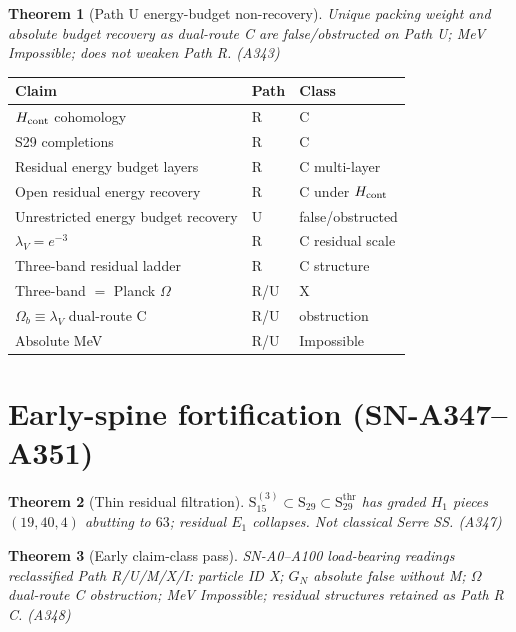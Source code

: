 \documentclass[11pt,a4paper]{article}
\newtheorem{theorem}{Theorem}
\theoremstyle{remark}
\begin{document}
\begin{theorem}[Path U energy-budget non-recovery]
Unique packing weight and absolute budget recovery as dual-route C are false/obstructed on Path U; MeV Impossible; does not weaken Path R. (A343)
\end{theorem}

\begin{center}
\begin{tabular}{@{}p{4.2cm}p{2cm}p{5.5cm}@{}}
\toprule
Claim & Path & Class \\
\midrule
$H_{\rm cont}$ cohomology & R & C \\
S29 completions & R & C \\
Residual energy budget layers & R & C multi-layer \\
Open residual energy recovery & R & C under $H_{\rm cont}$ \\
Unrestricted energy budget recovery & U & false/obstructed \\
$\lambda_V=e^{-3}$ & R & C residual scale \\
Three-band residual ladder & R & C structure \\
Three-band $=$ Planck $\Omega$ & R/U & X \\
$\Omega_b\equiv\lambda_V$ dual-route C & R/U & obstruction \\
Absolute MeV & R/U & Impossible \\
\bottomrule
\end{tabular}
\end{center}


\section{Early-spine fortification (SN-A347--A351)}
\label{sec:early-fort}

\begin{theorem}[Thin residual filtration]
$\mathrm{S}_{15}^{(3)}\subset\mathrm{S}_{29}\subset\mathrm{S}_{29}^{\mathrm{thr}}$ has graded $H_1$ pieces $(19,40,4)$ abutting to $63$; residual $E_1$ collapses. Not classical Serre SS. (A347)
\end{theorem}

\begin{theorem}[Early claim-class pass]
SN-A0--A100 load-bearing readings reclassified Path R/U/M/X/I: particle ID X; $G_N$ absolute false without M; $\Omega$ dual-route C obstruction; MeV Impossible; residual structures retained as Path R C. (A348)
\end{theorem}
\end{document}
